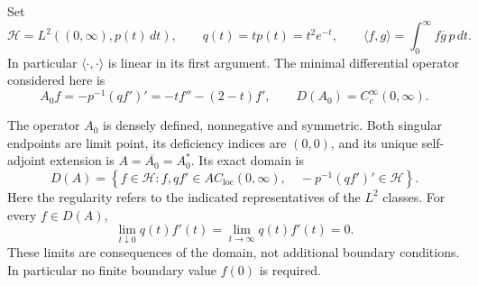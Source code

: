 Set
\[
 \mathcal H=L^2((0,\infty),p(t)\,dt),\qquad q(t)=tp(t)=t^2e^{-t},
 \qquad \langle f,g\rangle=\int_0^\infty f\overline g\,p\,dt.
\]
In particular $\langle\cdot,\cdot\rangle$ is linear in its first
argument.  The minimal differential operator considered here is
\begin{equation}\label{final:O3-minimal}
 A_0f=-p^{-1}(qf')'=-tf''-(2-t)f',\qquad
 D(A_0)=C_c^\infty(0,\infty).
\end{equation}

\begin{theorem}
\label{final:O3}
The operator $A_0$ is densely defined, nonnegative and symmetric.
Both singular endpoints are limit point, its deficiency indices are
$(0,0)$, and its unique self-adjoint extension is
$A=\overline{A_0}=A_0^*$.  Its exact domain is
\begin{equation}\label{final:O3-domain}
 D(A)=\left\{f\in\mathcal H:
 f,qf'\in AC_{\mathrm{loc}}(0,\infty),\quad
 -p^{-1}(qf')'\in\mathcal H\right\}.
\end{equation}
Here the regularity refers to the indicated representatives of the
$L^2$ classes.  For every $f\in D(A)$,
\begin{equation}\label{final:O3-flux}
 \lim_{t\downarrow0}q(t)f'(t)=
 \lim_{t\to\infty}q(t)f'(t)=0.
\end{equation}
These limits are consequences of the domain, not additional boundary
conditions.  In particular no finite boundary value $f(0)$ is required.
\end{theorem}

